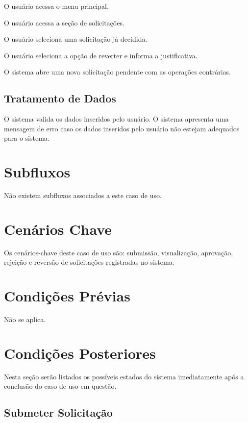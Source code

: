 \documentclass[12pt,a4paper]{article}
\begin{document}
\begin{fluxo}
  \item O usuário acessa o menu principal.
  \item O usuário acessa a seção de solicitações.
  \item O usuário seleciona uma solicitação já decidida.
  \item O usuário seleciona a opção de reverter e informa a justificativa.
  \item O sistema abre uma nova solicitação pendente com as operações
        contrárias.
\end{fluxo}

\subsection{Tratamento de Dados}

O sistema valida os dados inseridos pelo usuário. O sistema apresenta uma
mensagem de erro caso os dados inseridos pelo usuário não estejam adequados
para o sistema.

\section{Subfluxos}

Não existem subfluxos associados a este caso de uso.

\section{Cenários Chave}

Os cenários-chave deste caso de uso são: submissão, visualização, aprovação,
rejeição e reversão de solicitações registradas no sistema.

\section{Condições Prévias}

Não se aplica.

\section{Condições Posteriores}

Nesta seção serão listados os possíveis estados do sistema imediatamente após
a conclusão do caso de uso em questão.

\subsection{Submeter Solicitação}
\end{document}
